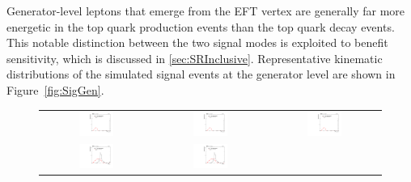 Generator-level leptons that emerge from the \ac{EFT} vertex are generally far more energetic in the top quark production events than the top quark decay events. This notable distinction between the two signal modes is exploited to benefit sensitivity, which is discussed in \autoref{sec:SRInclusive}. Representative kinematic distributions of the simulated signal events at the generator level are shown in Figure~\ref{fig:SigGen}.

 \begin{figure}[tbh!]
 \begin{center}
 \begin{tabular}{ccc}
 \includegraphics[width=0.33\textwidth]{figures/Part4/Signal/llM_emu}&
 \includegraphics[width=0.33\textwidth]{figures/Part4/Signal/llM_etau}&
 \includegraphics[width=0.33\textwidth]{figures/Part4/Signal/llM_mutau}\\
 \includegraphics[width=0.33\textwidth]{figures/Part4/Signal/llDr_emu}&
 \includegraphics[width=0.33\textwidth]{figures/Part4/Signal/llDr_etau}&

\end{tabular}
\end{center}
\end{figure}
